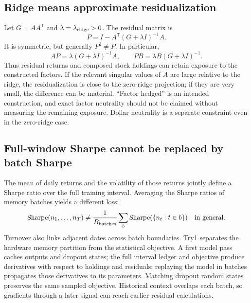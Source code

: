 \documentclass[11pt]{article}
\begin{document}
\subsection{Ridge means approximate residualization}
\label{sec:ridge-caveat}

Let $G=AA^{\mathsf T}$ and $\lambda=\lambda_{\rm ridge}>0$.
The residual matrix is
\begin{equation}
 P=I-A^{\mathsf T}(G+\lambda I)^{-1}A.
\end{equation}
It is symmetric, but generally $P^2\ne P$. In particular,
\begin{equation}
 AP=\lambda(G+\lambda I)^{-1}A,
 \qquad PB=\lambda B(G+\lambda I)^{-1}.
 \label{eq:ridge-exposure}
\end{equation}
Thus residual returns and composed stock holdings can retain exposure
to the constructed factors. If the relevant singular values of $A$
are large relative to the ridge, the residualization is close to the
zero-ridge projection; if they are very small, the difference can be
material. ``Factor hedged'' is an intended construction, and exact
factor neutrality should not be claimed without measuring the
remaining exposure. Dollar neutrality is a separate constraint even
in the zero-ridge case.

\subsection{Full-window Sharpe cannot be replaced by batch Sharpe}
\label{sec:window-sharpe}

The mean of daily returns and the volatility of those returns jointly
define a Sharpe ratio over the full training interval. Averaging the
Sharpe ratios of memory batches yields a different loss:
\begin{equation}
 \operatorname{Sharpe}(n_1,\ldots,n_T)
 \ne \frac1{B_{\rm batches}}\sum_b
 \operatorname{Sharpe}(\{n_t:t\in b\})
 \quad\text{in general}.
\end{equation}
Turnover also links adjacent dates across batch boundaries. Try1
separates the hardware memory partition from the statistical
objective. A first model pass caches outputs and dropout states;
the full interval ledger and objective produce derivatives with
respect to holdings and residuals; replaying the model in batches
propagates those derivatives to its parameters. Matching dropout
random states preserves the same sampled objective. Historical
context overlaps each batch, so gradients through a later signal
can reach earlier residual calculations.
\end{document}
